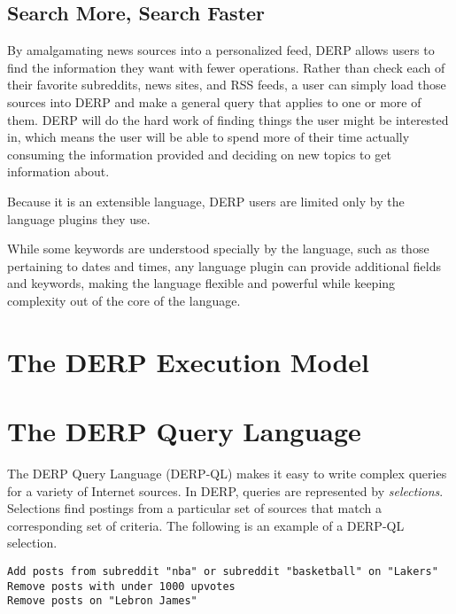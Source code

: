 \documentclass{article}
\begin{document}
\subsection{Search More, Search Faster}
By amalgamating news sources into a personalized feed, DERP allows users to find the information they want with fewer operations. Rather than check each of their favorite subreddits, news sites, and RSS feeds, a user can simply load those sources into DERP and make a general query that applies to one or more of them. DERP will do the hard work of finding things the user might be interested in, which means the user will be able to spend more of their time actually consuming the information provided and deciding on new topics to get information about.

Because it is an extensible language, DERP users are limited only by the language plugins they use. 
\begin{comment}
@ADS Is this also something we officially decided on? I felt that we were leaning toward it
\end{comment}
While some keywords are understood specially by the language, such as those pertaining to dates and times, any language plugin can provide additional fields and keywords, making the language flexible and powerful while keeping  complexity out of the core of the language.


\newpage
\section{\textbf{The DERP Execution Model}}




\newpage
\section{\textbf{The DERP Query Language}}
The DERP Query Language (DERP-QL) makes it easy to write complex queries for a variety of Internet sources. In DERP, queries are represented by \textit{selections}. Selections find postings from a particular set of sources that match a corresponding set of criteria. The following is an example of a DERP-QL selection.

\begin{lstlisting}
Add posts from subreddit "nba" or subreddit "basketball" on "Lakers"
Remove posts with under 1000 upvotes
Remove posts on "Lebron James"
\end{lstlisting}






\end{document}
